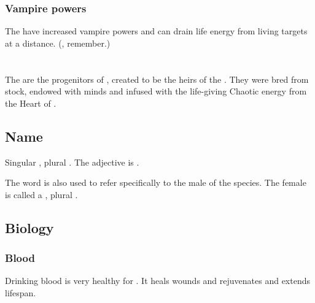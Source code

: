 \subsubsection{Vampire powers}
The \neoresphain{} have increased vampire powers and can drain life energy from living targets at a distance. 
(, remember.) 















\section{\Resphan}
The \resphain{} are the progenitors of \humans{}, created to be the heirs of the \SitraAchra. 
They were bred from \nephilic{} stock, endowed with \erebean{} minds and infused with the life-giving Chaotic energy from the Heart of \Miith. 









\subsection{Name}
Singular \emph{\resphan{}}, plural \emph{\resphain{}}. The adjective is \emph{\resphan{}}. 

The word \quo{\resphan} is also used to refer specifically to the male of the species. The female is called a \resvil, plural \resviel. 









\subsection{Biology}





\subsubsection{Blood}
Drinking \resphan blood is very healthy for \humans.
It heals wounds and rejuvenates and extends lifespan.

